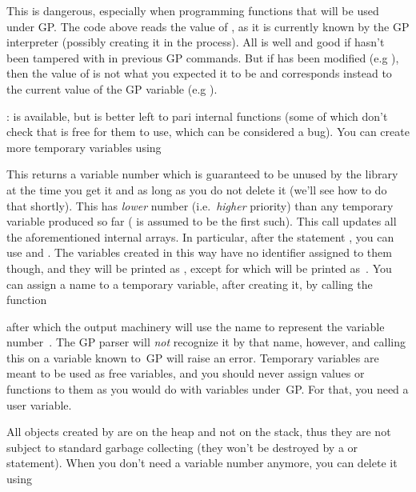 \noindent This is dangerous, especially when programming functions that
will be used under GP. The code above reads the value of , as it is
currently known by the GP interpreter (possibly creating it in the
process). All is well and good if  hasn't been tampered with in
previous GP commands. But if  has been modified (e.g ),
then the value of  is not what you expected it to be and corresponds
instead to the current value of the GP variable (e.g ).

: 
 is available, but is better left to pari internal functions
(some of which don't check that  is free for them to use,
which can be considered a bug). You can create more temporary variables
using

\label{se:fetch_var}

\noindent
This returns a variable number which is guaranteed to be unused by the
library at the time you get it and as long as you do not delete it (we'll see
how to do that shortly). This has {\it lower\/} number (i.e.~{\it higher\/}
priority) than any temporary variable produced so far ( is
assumed to be the first such). This call updates all the aforementioned
internal arrays. In particular, after the statement ,
you can use  and . The variables created in this
way have no identifier assigned to them though, and they will be printed as
, except for  which will be printed
as~\kbd{\#}. You can assign a name to a temporary variable, after creating
it, by calling the function


\noindent after which the output machinery will use the name  to
represent the variable number~. The GP parser will {\it not\/}
recognize it by that name, however, and calling this on a variable known
to~GP will raise an error. Temporary variables are meant to be used as free
variables, and you should never assign values or functions to them as you
would do with variables under~GP. For that, you need a user variable.

All objects created by  are on the heap and not on the stack,
thus they are not subject to standard garbage collecting (they won't be
destroyed by a  or  statement). When you don't
need a variable number anymore, you can delete it using

